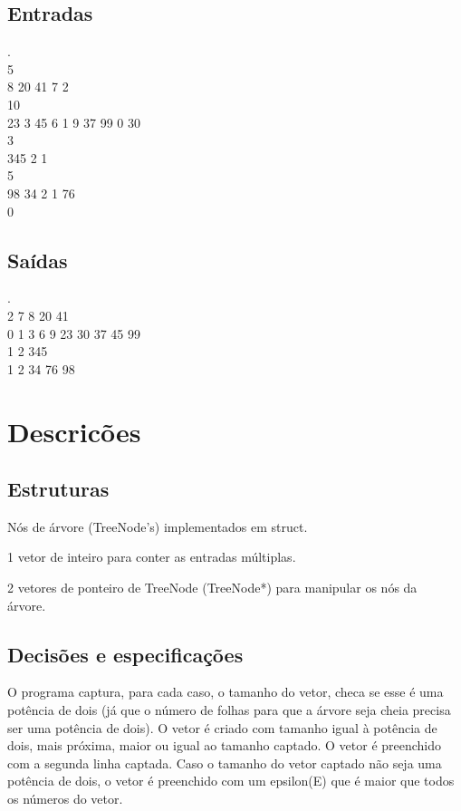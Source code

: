 \documentclass[a4paper,12pt]{article}
\begin{document}
    \subsection{Entradas}
        . \\
        5 \\
        8 20 41 7 2 \\
        10 \\
        23 3 45 6 1 9 37 99 0 30 \\
        3 \\
        345 2 1 \\
        5 \\
        98 34 2 1 76 \\
        0 
        
    \subsection{Saídas}
        . \\
        2 7 8 20 41 \\
        0 1 3 6 9 23 30 37 45 99 \\
        1 2 345 \\
        1 2 34 76 98

\section{Descricões}

    \subsection{Estruturas}
        \begin{list}{} {
        \setlength{\leftmargin}{0cm}
        \setlength{\rightmargin}{0cm}
        \setlength{\labelwidth}{0pt}
        \setlength{\labelsep}{\leftmargin}}
            \item Nós de árvore (TreeNode's) implementados em struct.\
            \item 1 vetor de inteiro para conter as entradas múltiplas.\
            \item 2 vetores de ponteiro de TreeNode (TreeNode*) para manipular os nós da árvore.\
        \end{list}
        
    \subsection{Decisões e especificações}
        O programa captura, para cada caso, o tamanho do vetor, checa se esse é uma potência de dois (já que o número de folhas para que a árvore seja cheia precisa ser uma potência de dois). O vetor é criado com tamanho igual à potência de dois, mais próxima, maior ou igual ao tamanho captado. O vetor é preenchido com a segunda linha captada. Caso o tamanho do vetor captado não seja uma potência de dois, o vetor é preenchido com um epsilon(E) que é maior que todos os números do vetor.
        \\
        
\end{document}
